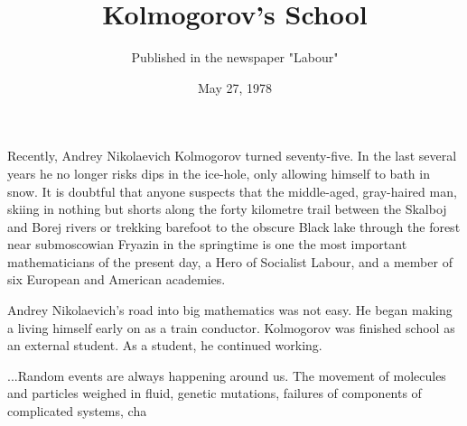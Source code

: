 \documentclass{article}
\begin{document}
\title{Kolmogorov's School}
\date{May 27, 1978}
\author{Published in the newspaper "Labour"}
\maketitle
Recently, Andrey Nikolaevich Kolmogorov turned seventy-five.
In the last several years he no longer risks dips in the ice-hole, only allowing himself to bath in snow.
It is doubtful that anyone suspects that the middle-aged, gray-haired man, skiing in nothing but shorts along the forty kilometre trail between the Skalboj and Borej rivers or trekking barefoot to the obscure Black lake through the forest near submoscowian Fryazin in the springtime is one the most important mathematicians of the present day, a Hero of Socialist Labour, and a member of six European and American academies.

Andrey Nikolaevich's road into big mathematics was not easy. He began making a living himself early on as a train conductor. Kolmogorov was finished school as an external student.
As a student, he continued working.

...Random events are always happening around us. The movement of molecules and particles weighed in fluid, genetic mutations, failures of components of complicated systems, cha
\end{document}
